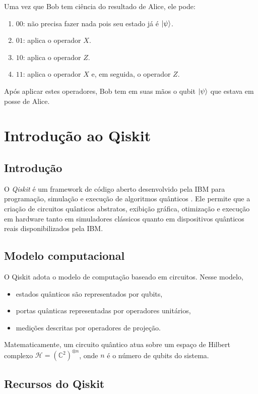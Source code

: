 Uma vez que Bob tem ciência do resultado de Alice, ele pode:

\begin{enumerate}
    \item $00$: não precisa fazer nada pois seu estado já é $\ket{\psi}$.
    \item $01$: aplica o operador $X$.
    \item $10$: aplica o operador $Z$.
    \item $11$: aplica o operador $X$ e, em seguida, o operador $Z$.
\end{enumerate}
Após aplicar estes operadores, Bob tem em suas mãos o qubit $\ket{\psi}$ que estava em posse de Alice.

\section{Introdução ao Qiskit}

\subsection{Introdução}

O \emph{Qiskit} é um framework de código aberto desenvolvido pela IBM para programação, simulação e execução de algoritmos quânticos \cite{QiskitCommunity2017}. Ele permite que a criação de circuitos quânticos abstratos, exibição gráfica, otimização e execução em hardware tanto em simuladores clássicos quanto em dispositivos quânticos reais disponibilizados pela IBM.

\subsection{Modelo computacional}

O Qiskit adota o modelo de computação baseado em circuitos. Nesse modelo,
\begin{itemize}
    \item estados quânticos são representados por qubits,
    \item portas quânticas representadas por operadores unitários,
    \item medições descritas por operadores de projeção.
\end{itemize}

Matematicamente, um circuito quântico atua sobre um espaço de Hilbert complexo $\mathcal{H} = (\mathbb{C}^2)^{\otimes n}$, onde $n$ é o número de qubits do sistema.

\subsection{Recursos do Qiskit}

